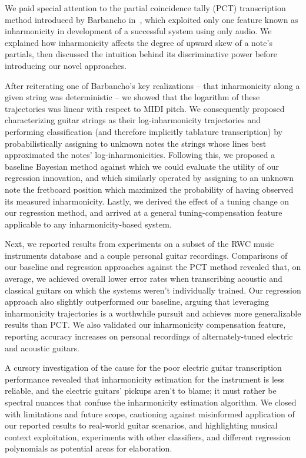 \documentclass[12pt]{cmuthesis}
\begin{document}
We paid special attention to the partial coincidence tally (PCT) transcription method introduced by Barbancho in~\cite{barbanchoi2012}, which exploited only one feature known as inharmonicity in development of a successful system using only audio. We explained how inharmonicity affects the degree of upward skew of a note's partials, then discussed the intuition behind its discriminative power before introducing our novel approaches.

After reiterating one of Barbancho's key realizations -- that inharmonicity along a given string was deterministic -- we showed that the logarithm of these trajectories was linear with respect to MIDI pitch. We consequently proposed characterizing guitar strings as their log-inharmonicity trajectories and performing classification (and therefore implicitly tablature transcription) by probabilistically assigning to unknown notes the strings whose lines best approximated the notes' log-inharmonicities. Following this, we proposed a baseline Bayesian method against which we could evaluate the utility of our regression innovation, and which similarly operated by assigning to an unknown note the fretboard position which maximized the probability of having observed its measured inharmonicity. Lastly, we derived the effect of a tuning change on our regression method, and arrived at a general tuning-compensation feature applicable to any inharmonicity-based system.

Next, we reported results from experiments on a subset of the RWC music instruments database and a couple personal guitar recordings. Comparisons of our baseline and regression approaches against the PCT method revealed that, on average, we achieved overall lower error rates when transcribing acoustic and classical guitars on which the systems weren't individually trained. Our regression approach also slightly outperformed our baseline, arguing that leveraging inharmonicity trajectories is a worthwhile pursuit and achieves more generalizable results than PCT. We also validated our inharmonicity compensation feature, reporting accuracy increases on personal recordings of alternately-tuned electric and acoustic guitars.

A cursory investigation of the cause for the poor electric guitar transcription performance revealed that inharmonicity estimation for the instrument is less reliable, and the electric guitars' pickups aren't to blame; it must rather be spectral nuances that confuse the inharmonicity estimation algorithm. We closed with limitations and future scope, cautioning against misinformed application of our reported results to real-world guitar scenarios, and highlighting musical context exploitation, experiments with other classifiers, and different regression polynomials as potential areas for elaboration.
\end{document}
